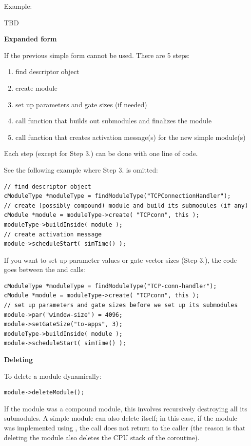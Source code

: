 Example:


TBD


\textbf{Expanded form}


If the previous simple form cannot be used. There are 5 steps:
\begin{enumerate}
  \item{find descriptor object}
  \item{create module}
  \item{set up parameters and gate sizes (if needed)}
  \item{call function that builds out submodules and finalizes the
    module}
  \item{call function that creates activation message(s) for the new
    simple module(s)}
\end{enumerate}
Each step (except for Step 3.) can be done with one line of code. 



See the following example where Step 3. is omitted:

\begin{Verbatim}
// find descriptor object
cModuleType *moduleType = findModuleType("TCPConnectionHandler");
// create (possibly compound) module and build its submodules (if any)
cModule *module = moduleType->create( "TCPconn", this );
moduleType->buildInside( module );
// create activation message
module->scheduleStart( simTime() );
\end{Verbatim}

If you want to set up parameter values or gate vector sizes (Step 3.),
the code goes between the  and
 calls:

\begin{Verbatim}
cModuleType *moduleType = findModuleType("TCP-conn-handler");
cModule *module = moduleType->create( "TCPconn", this );
// set up parameters and gate sizes before we set up its submodules
module->par("window-size") = 4096;
module->setGateSize("to-apps", 3);
moduleType->buildInside( module );
module->scheduleStart( simTime() );
\end{Verbatim}


\textbf{Deleting}


To delete a module dynamically:

\begin{Verbatim}
module->deleteModule();
\end{Verbatim}



If the module was a compound module, this involves recursively
destroying all its submodules. A simple module can also delete itself;
in this case, if the module was implemented using ,
the  call does not return to the caller (the
reason is that deleting the module also deletes the CPU stack of the
coroutine).

